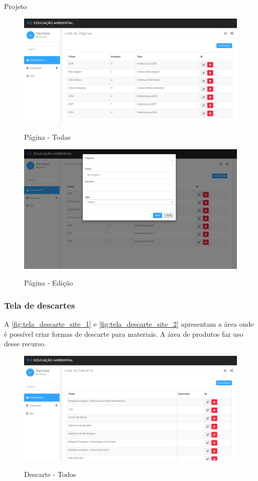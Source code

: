 \documentclass[
	12pt,				%
	openany,			%
	twoside,			%
	a4paper,			%
	english,			%
	french,				%
	spanish,			%
	brazil				%
	]{abntex2}
\begin{document}
\begin{chapter}{Projeto}
\begin{figure}[h]
\centering
   \caption{Página - Todas}
   \includegraphics[scale=0.40]{media/tela_pagina_site_1.png}
     \label{fig:tela_pagina_site_1}
\end{figure}

\begin{figure}[h]
\centering
   \caption{Página - Edição}
   \includegraphics[scale=0.40]{media/tela_pagina_site_2.png}
     \label{fig:tela_pagina_site_2}
\end{figure}
\newpage
\subsubsection{Tela de descartes} \label{tela_descarte}
A \autoref{fig:tela_descarte_site_1} e \autoref{fig:tela_descarte_site_2} apresentam a área onde é possível criar formas de descarte para materiais. A área de produtos faz uso desse recurso.

\begin{figure}[h]
\centering
   \caption{Descarte - Todos}
   \includegraphics[scale=0.40]{media/tela_descarte_site_1.png}
     \label{fig:tela_descarte_site_1}
\end{figure}


\end{chapter}
\end{document}
